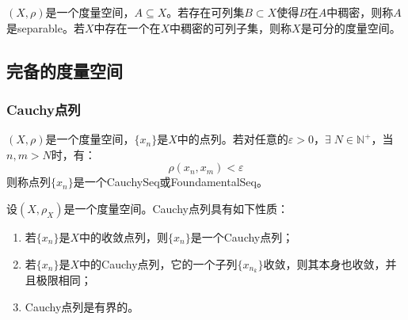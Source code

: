 \begin{definition}
	$(X,\rho)$是一个度量空间，$A\subseteq X$。若存在可列集$B\subset X$使得$B$在$A$中稠密，则称$A$是\gls{separable}。若$X$中存在一个在$X$中稠密的可列子集，则称$X$是可分的度量空间。
\end{definition}
\subsection{完备的度量空间}
\subsubsection{Cauchy点列}
\begin{definition}
	$(X,\rho)$是一个度量空间，$\{x_n\}$是$X$中的点列。若对任意的$\varepsilon>0$，$\exists\;N\in\mathbb{N}^+$，当$n,m>N$时，有：
	\begin{equation*}
		\rho(x_n,x_m)<\varepsilon
	\end{equation*}
	则称点列$\{x_n\}$是一个\gls{CauchySeq}或\gls{FoundamentalSeq}。
\end{definition}
\begin{property}\label{prop:CauchySeq}
	设$(X,\rho_X)$是一个度量空间。Cauchy点列具有如下性质：
	\begin{enumerate}
		\item 若$\{x_n\}$是$X$中的收敛点列，则$\{x_n\}$是一个Cauchy点列；
		\item 若$\{x_n\}$是$X$中的Cauchy点列，它的一个子列$\{x_{n_k}\}$收敛，则其本身也收敛，并且极限相同；
		\item Cauchy点列是有界的。
	\end{enumerate}
\end{property}
